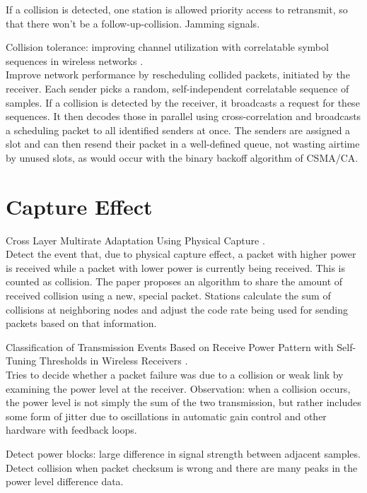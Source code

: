 If a collision is detected, one station is allowed priority access to retransmit, so that there won't be a follow-up-collision. Jamming signals.

Collision tolerance: improving channel utilization with correlatable symbol sequences in wireless networks \cite{zhao2015}.\\

Improve network performance by rescheduling collided packets, initiated by the receiver. Each sender picks a random, self-independent correlatable sequence of samples. If a collision is detected by the receiver, it broadcasts a request for these sequences. It then decodes those in parallel using cross-correlation and broadcasts a scheduling packet to all identified senders at once. The senders are assigned a slot and can then resend their packet in a well-defined queue, not wasting airtime by unused slots, as would occur with the binary backoff algorithm of CSMA/CA.



\section{Capture Effect}

Cross Layer Multirate Adaptation Using Physical Capture \cite{park2009}.\\

Detect the event that, due to physical capture effect, a packet with higher power is received while a packet with lower power is currently being received. This is counted as collision. The paper proposes an algorithm to share the amount of received collision using a new, special packet. Stations calculate the sum of collisions at neighboring nodes and adjust the code rate being used for sending packets based on that information.

Classification of Transmission Events Based on Receive Power Pattern with Self-Tuning Thresholds in Wireless Receivers \cite{chua2016}.\\

Tries to decide whether a packet failure was due to a collision or weak link by examining the power level at the receiver. Observation: when a collision occurs, the power level is not simply the sum of the two transmission, but rather includes some form of jitter due to oscillations in automatic gain control and other hardware with feedback loops.

Detect power blocks: large difference in signal strength between adjacent samples. Detect collision when packet checksum is wrong and there are many peaks in the power level difference data.

